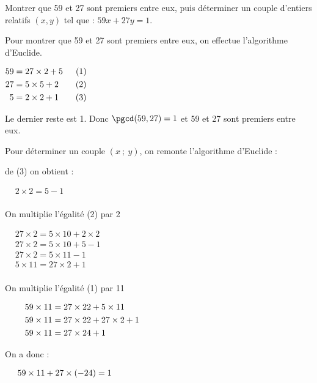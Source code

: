 \begin{methode*1}[Déterminer un couple (\textit{u}\ ;\ \textit{v}) tel que \textit{au}~+~\textit{bv}~=~1\MethodeRefExercice*{exo-sol_particuliere}]
\exercice\label{methode-sol_particuliere}

Montrer que 59 et 27 sont premiers entre eux, puis déterminer un couple d'entiers relatifs $(x,y)$ tel que : \enskip $59x+27y=1$.

\correction

\vspace{-5mm}
\begin{multicols}{2}
Pour montrer que 59 et 27 sont premiers entre eux, on effectue
l'algorithme d'Euclide. 
\begin{center}
$\begin{aligned}
59&=27\times2+5\qquad\hskip-1.7mm (1)\\
27&=5\times5+2\qquad (2)\\
5&=2\times2+1\qquad (3)\end{aligned}$
\end{center}\medskip

Le dernier reste est 1. Donc $\pgcd(59,27)=1$ et 59 et 27 sont premiers entre eux.
\vspace*{4cm}

\columnbreak 

Pour déterminer un couple $(x\ ;\ y)$, on remonte l'algorithme
d'Euclide : 

de (3) on obtient :
\begin{center}$\begin{aligned}
&2\times2=5-1\\
\end{aligned}$\end{center}
On multiplie l'égalité (2) par 2
\begin{center}$\begin{aligned}
&27\times2=5\times10+2\times2\\
&27\times2=5\times10+5-1\\
&27\times2=5\times11-1\\
&5\times11=27\times2+1\\
\end{aligned}$
\end{center}
On multiplie l'égalité (1) par 11
\begin{center}
$\begin{aligned}
\hspace{0.8cm}&59\times11=27\times22+5\times11\\
&59\times11=27\times22+27\times2+1\\
&59\times11=27\times24+1\\
\end{aligned}$
\end{center}
On a donc :
\begin{center}
$\begin{aligned}
\hspace{0.5cm}&59\times11+27\times(-24)=1
\end{aligned}$
\end{center}
\end{multicols}

\vspace{-5mm}
\end{methode*1}


